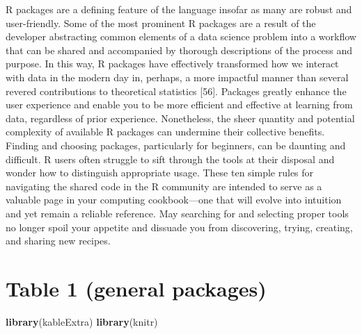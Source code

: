 \documentclass[10pt,letterpaper]{article}
\newenvironment{Shaded}{\begin{snugshade}}{\end{snugshade}}
\newcommand{\KeywordTok}[1]{\textcolor[rgb]{0.13,0.29,0.53}{\textbf{#1}}}
\newcommand{\NormalTok}[1]{#1}
\begin{document}
R packages are a defining feature of the language insofar as many are
robust and user-friendly. Some of the most prominent R packages are a
result of the developer abstracting common elements of a data science
problem into a workflow that can be shared and accompanied by thorough
descriptions of the process and purpose. In this way, R packages have
effectively transformed how we interact with data in the modern day in,
perhaps, a more impactful manner than several revered contributions to
theoretical statistics {[}56{]}. Packages greatly enhance the user
experience and enable you to be more efficient and effective at learning
from data, regardless of prior experience. Nonetheless, the sheer
quantity and potential complexity of available R packages can undermine
their collective benefits. Finding and choosing packages, particularly
for beginners, can be daunting and difficult. R users often struggle to
sift through the tools at their disposal and wonder how to distinguish
appropriate usage. These ten simple rules for navigating the shared code
in the R community are intended to serve as a valuable page in your
computing cookbook---one that will evolve into intuition and yet remain
a reliable reference. May searching for and selecting proper tools no
longer spoil your appetite and dissuade you from discovering, trying,
creating, and sharing new recipes.

\hypertarget{table-1-general-packages}{%
\section{Table 1 (general packages)}\label{table-1-general-packages}}

\begin{Shaded}
\begin{Highlighting}[]
\KeywordTok{library}\NormalTok{(kableExtra)}
\KeywordTok{library}\NormalTok{(knitr)}
\end{Highlighting}
\end{Shaded}
\end{document}
